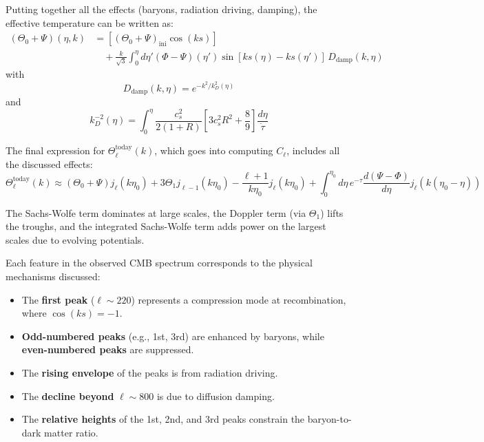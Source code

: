 \documentclass{aa}
\numberwithin{equation}{section}
\numberwithin{table}{section}
\numberwithin{figure}{section}
\begin{document}
Putting together all the effects (baryons, radiation driving, damping), the effective temperature can be written as:
\begin{align}
(\Theta_0 + \Psi)(\eta, k) &= [(\Theta_0 + \Psi)_{\mathrm{ini}} \cos(ks)] \\
&\quad + \frac{k}{\sqrt{3}} \int_0^\eta d\eta' (\Phi - \Psi)(\eta') \sin[ks(\eta) - ks(\eta')] \, D_{\text{damp}}(k, \eta)
\end{align}
with
\begin{equation}
D_{\text{damp}}(k, \eta) = e^{-k^2 / k_D^2(\eta)}
\end{equation}
and
\begin{equation}
k_D^{-2}(\eta) = \int_0^\eta \frac{c_s^2}{2(1 + R)} \left[ 3c_s^2 R^2 + \frac{8}{9} \right] \frac{d\eta}{\dot{\tau}}
\end{equation}

The final expression for $\Theta_\ell^{\text{today}}(k)$, which goes into computing $C_\ell$, includes all the discussed effects:
\begin{equation}
\Theta_\ell^{\text{today}}(k) \approx (\Theta_0 + \Psi) j_\ell(k\eta_0) + 3\Theta_1 j_{\ell-1}(k\eta_0) - \frac{\ell + 1}{k\eta_0} j_\ell(k\eta_0) + \int_0^{\eta_0} d\eta \, e^{-\tau} \frac{d(\Psi - \Phi)}{d\eta} j_\ell(k(\eta_0 - \eta))
\end{equation}

The Sachs-Wolfe term dominates at large scales, the Doppler term (via $\Theta_1$) lifts the troughs, and the integrated Sachs-Wolfe term adds power on the largest scales due to evolving potentials.

Each feature in the observed CMB spectrum corresponds to the physical mechanisms discussed:
\begin{itemize}
  \item The \textbf{first peak} ($\ell \sim 220$) represents a compression mode at recombination, where $\cos(ks) = -1$.
  \item \textbf{Odd-numbered peaks} (e.g., 1st, 3rd) are enhanced by baryons, while \textbf{even-numbered peaks} are suppressed.
  \item The \textbf{rising envelope} of the peaks is from radiation driving.
  \item The \textbf{decline beyond} $\ell \sim 800$ is due to diffusion damping.
  \item The \textbf{relative heights} of the 1st, 2nd, and 3rd peaks constrain the baryon-to-dark matter ratio.
\end{itemize}
\end{document}

